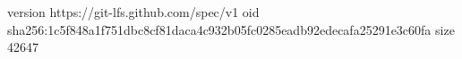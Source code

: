 version https://git-lfs.github.com/spec/v1
oid sha256:1c5f848a1f751dbc8cf81daca4c932b05fc0285eadb92edecafa25291e3c60fa
size 42647
